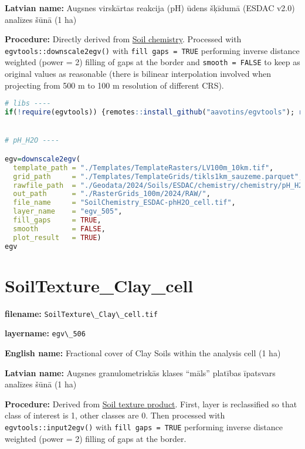 \documentclass[
]{book}
\newcommand{\passthrough}[1]{#1}
\begin{document}
\textbf{Latvian name:} Augsnes virskārtas reakcija (pH) ūdens šķīdumā (ESDAC v2.0) analīzes šūnā (1 ha)

\textbf{Procedure:} Directly derived from \hyperref[Ch04.07.01]{Soil chemistry}. Processed
with \passthrough{\lstinline!egvtools::downscale2egv()!} with \passthrough{\lstinline!fill gaps = TRUE!} performing inverse
distance weighted (power = 2) filling of gaps at the border and \passthrough{\lstinline!smooth = FALSE!}
to keep as original values as reasonable (there is bilinear interpolation
involved when projecting from 500 m to 100 m resolution of different CRS).

\begin{lstlisting}[language=R]
# libs ----
if(!require(egvtools)) {remotes::install_github("aavotins/egvtools"); require(egvtools)}


# pH_H2O ----

egv=downscale2egv(
  template_path = "./Templates/TemplateRasters/LV100m_10km.tif",
  grid_path     = "./Templates/TemplateGrids/tikls1km_sauzeme.parquet",
  rawfile_path  = "./Geodata/2024/Soils/ESDAC/chemistry/chemistry/pH_H2O/pH_H2O.tif",
  out_path      = "./RasterGrids_100m/2024/RAW/",
  file_name     = "SoilChemistry_ESDAC-phH2O_cell.tif",
  layer_name    = "egv_505",
  fill_gaps     = TRUE,
  smooth        = FALSE,
  plot_result   = TRUE)
egv
\end{lstlisting}

\section{SoilTexture\_Clay\_cell}\label{ch06.506}

\textbf{filename:} \passthrough{\lstinline!SoilTexture\_Clay\_cell.tif!}

\textbf{layername:} \passthrough{\lstinline!egv\_506!}

\textbf{English name:} Fractional cover of Clay Soils within the analysis cell (1 ha)

\textbf{Latvian name:} Augsnes granulometriskās klases ``māls'' platības īpatsvars analīzes šūnā (1 ha)

\textbf{Procedure:} Derived from \hyperref[Ch05.02]{Soil texture product}. First, layer is
reclassified so that class of interest is 1, other classes are 0. Then processed
with \passthrough{\lstinline!egvtools::input2egv()!} with \passthrough{\lstinline!fill gaps = TRUE!} performing inverse
distance weighted (power = 2) filling of gaps at the border.
\end{document}

